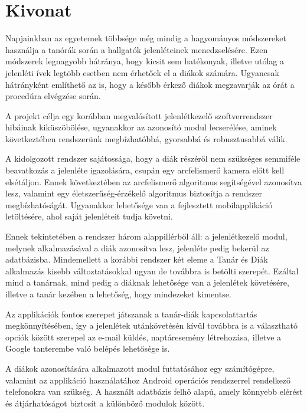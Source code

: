 
\hungarianParagraph


\chapter*{Kivonat}

Napjainkban az egyetemek többsége még mindig a hagyományos  módszereket használja a tanórák során a hallgatók jelenléteinek menedzselésére. Ezen módszerek legnagyobb hátránya, hogy kicsit sem hatékonyak, illetve utólag a jelenléti ívek legtöbb esetben nem érhetőek el a diákok számára. Ugyancsak hátrányként említhető az is, hogy a később érkező diákok megzavarják az órát a procedúra elvégzése során.

A projekt célja egy korábban megvalósított jelenlétkezelő szoftverrendszer hibáinak kiküszöbölése, ugyanakkor az azonosító modul lecserélése, aminek következtében rendszerünk megbízhatóbbá, gyorsabbá és robusztusabbá válik. 

A kidolgozott rendszer sajátossága, hogy a diák részéről nem szükséges semmiféle beavatkozás a jelenléte igazolására, csupán egy arcfelismerő kamera előtt kell elsétáljon. Ennek következtében az arcfelismerő algoritmus segítségével azonosítva lesz, valamint egy életszerűség-érzékelő algoritmus biztosítja a rendszer megbízhatóságát. Ugyanakkor lehetősége van a fejlesztett mobilapplikáció letöltésére, ahol saját jelenléteit tudja követni.

Ennek tekintetében a rendszer három alappillérből áll: a jelenlétkezelő modul, melynek alkalmazásával a diák azonosítva lesz, jelenléte pedig bekerül az adatbázisba. Mindemellett a korábbi rendszer két eleme a Tanár és Diák alkalmazás kisebb változtatásokkal ugyan de továbbra is betölti szerepét. Ezáltal mind a tanárnak, mind pedig a diáknak lehetősége van a jelenlétek követésére, illetve a tanár kezében a lehetőség, hogy mindezeket kimentse.

Az applikációk fontos szerepet játszanak a tanár-diák kapcsolattartás megkönnyítésében, így a jelenlétek utánkövetésén kívül továbbra is a választható opciók között szerepel az e-mail küldés, naptáresemény létrehozása, illetve a Google tanterembe való belépés lehetősége is.

A diákok azonosítására alkalmazott modul futtatásához egy számítógépre, valamint az applikáció használatához Android operációs rendszerrel rendelkező telefonokra van szükség. A használt adatbázis felhő alapú, amely könnyebb elérést és átjárhatóságot biztosít a különböző modulok között.


